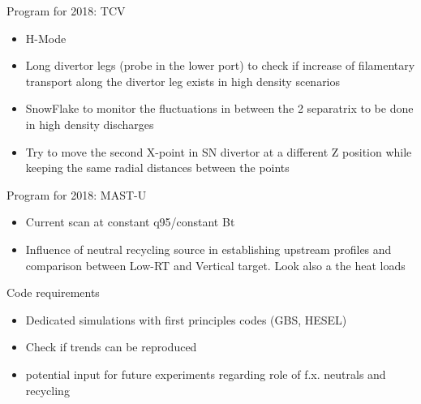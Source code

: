 \documentclass[10pt, compress]{beamer}
\begin{document}
\begin{frame}{Program for 2018: TCV}
  \begin{itemize}
     \item \textcolor{consorziored}{H-Mode} 
      \item Long divertor legs (probe in the lower port) to check if
        increase of filamentary transport along the divertor leg
        exists in high density scenarios
      \item \textcolor{taorange}{SnowFlake to monitor the fluctuations in between the 2 separatrix
	to be done in high density discharges}
       \item \textcolor{taorange}{Try to move the second X-point in SN divertor at a different
	Z position while keeping the same radial distances between the
	points}
\end{itemize}
\end{frame}

\begin{frame}{Program for 2018: MAST-U}
  \begin{itemize}
      \item Current scan at constant q95/constant Bt
      \item Influence of neutral recycling source in establishing upstream profiles
	and comparison between Low-RT and Vertical target. Look also a
        the heat loads
      \end{itemize}
\end{frame}

\begin{frame}{Code requirements}
  \begin{itemize}
    \item Dedicated simulations with first principles codes (GBS,
      HESEL)
    \item Check if trends can be reproduced
    \item potential input for future experiments regarding role of
        f.x. neutrals and recycling
  \end{itemize}
\end{frame}
\end{document}
